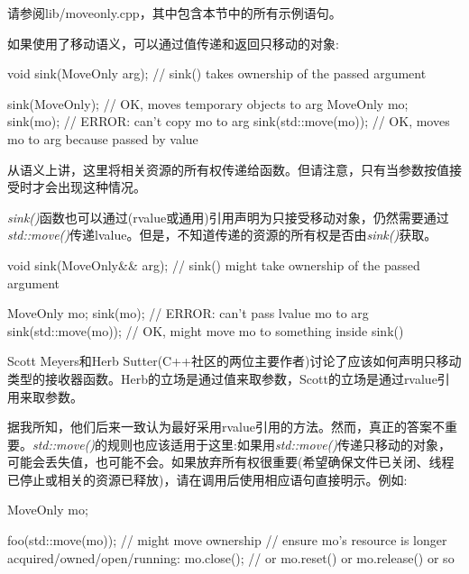 请参阅lib/moveonly.cpp，其中包含本节中的所有示例语句。\par


如果使用了移动语义，可以通过值传递和返回只移动的对象:\par

\begin{codebox}[cpp]
void sink(MoveOnly arg); // sink() takes ownership of the passed argument

sink(MoveOnly{}); // OK, moves temporary objects to arg
MoveOnly mo;
sink(mo); // ERROR: can’t copy mo to arg
sink(std::move(mo)); // OK, moves mo to arg because passed by value
\end{codebox}

从语义上讲，这里将相关资源的所有权传递给函数。但请注意，只有当参数按值接受时才会出现这种情况。\par

\textit{sink()}函数也可以通过(rvalue或通用)引用声明为只接受移动对象，仍然需要通过\textit{std::move()}传递lvalue。但是，不知道传递的资源的所有权是否由\textit{sink()}获取。\par

\begin{codebox}[cpp]
void sink(MoveOnly&& arg); // sink() might take ownership of the passed argument

MoveOnly mo;
sink(mo); // ERROR: can’t pass lvalue mo to arg
sink(std::move(mo)); // OK, might move mo to something inside sink()
\end{codebox}

Scott Meyers和Herb Sutter(C++社区的两位主要作者)讨论了应该如何声明只移动类型的接收器函数。Herb的立场是通过值来取参数，Scott的立场是通过rvalue引用来取参数。\par

据我所知，他们后来一致认为最好采用rvalue引用的方法。然而，真正的答案不重要。\textit{std::move()}的规则也应该适用于这里:如果用\textit{std::move()}传递只移动的对象，可能会丢失值，也可能不会。如果放弃所有权很重要(希望确保文件已关闭、线程已停止或相关的资源已释放)，请在调用后使用相应语句直接明示。例如:\par

\begin{codebox}[cpp]
MoveOnly mo;

foo(std::move(mo)); // might move ownership
// ensure mo’s resource is longer acquired/owned/open/running:
mo.close(); // or mo.reset() or mo.release() or so
\end{codebox}

